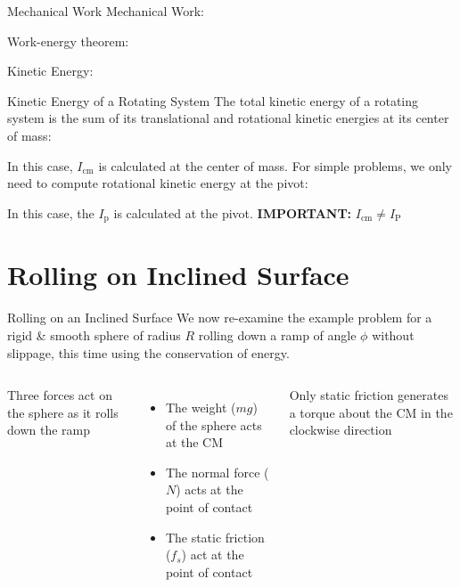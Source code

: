 \documentclass[12pt,compress,aspectratio=169]{beamer}
\begin{document}
\begin{frame}{Mechanical Work}
  Mechanical Work:


  Work-energy theorem:


  Kinetic Energy:
  
\end{frame}


\begin{frame}{Kinetic Energy of a Rotating System}
  The total kinetic energy of a rotating system is the sum of its translational
  and rotational kinetic energies at its center of mass:

  
  In this case, $I_\text{cm}$ is calculated at the center of mass. For simple
  problems, we only need to compute rotational kinetic energy at the pivot:

  
  In this case, the $I_\text{p}$ is calculated at the pivot.
  \textbf{IMPORTANT:} $I_\text{cm}\neq I_\text{P}$
\end{frame}



\section{Rolling on Inclined Surface}

\begin{frame}{Rolling on an Inclined Surface}
  We now re-examine the example problem for a rigid \& smooth sphere of radius
  $R$ rolling down a ramp of angle  $\phi$ without slippage, this time using
  the conservation of energy.

  \vspace{.2in}
  \begin{columns}
    

    Three forces act on the sphere as it rolls down the ramp
    \begin{itemize}
    \item The weight ($mg$) of the sphere acts at the CM
    \item The normal force ($N$) acts at the point of contact
    \item The static friction ($f_s$) act at the point of contact
    \end{itemize}
    Only static friction generates a torque about the CM in the clockwise
    direction
  \end{columns}
\end{frame}
\end{document}

